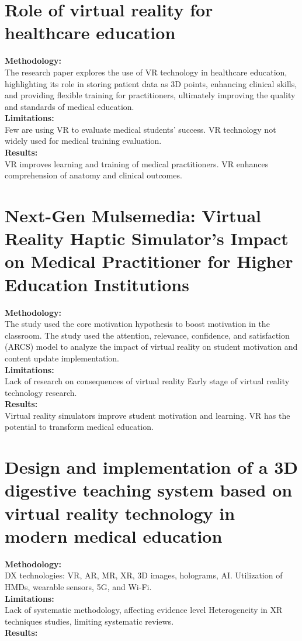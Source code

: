 \section{Role of virtual reality for healthcare education
\cite{BookChapter}}
\textbf{Methodology:}\\The research paper explores the use of VR technology in healthcare education, highlighting its role in storing patient data as 3D points, enhancing clinical skills, and providing flexible training for practitioners, ultimately improving the quality and standards of medical education.\\
\textbf{Limitations:}\\
Few are using VR to evaluate medical students' success. VR technology not widely used for medical training evaluation.\\
\textbf{Results:}\\ VR improves learning and training of medical practitioners.
VR enhances comprehension of anatomy and clinical outcomes.
\section{Next-Gen Mulsemedia: Virtual Reality Haptic Simulator’s Impact on Medical Practitioner for Higher Education Institutions\cite{journalarticle4}\cite{JournalArticle5}\cite{JournalArticle8}}
\textbf{Methodology:}\\ The study used the core motivation hypothesis to boost motivation in the classroom. The study used the attention, relevance, confidence, and satisfaction (ARCS) model to analyze the impact of virtual reality on student motivation and content update implementation.\\
\textbf{Limitations:}\\ Lack of research on consequences of virtual reality
Early stage of virtual reality technology research.\\
\textbf{Results:}\\ Virtual reality simulators improve student motivation and learning. VR has the potential to transform medical education.

\section{Design and implementation of a 3D digestive teaching system based on virtual reality technology in modern medical education\cite{Journal1}}
\textbf{Methodology:}\\
DX technologies: VR, AR, MR, XR, 3D images, holograms, AI. Utilization of HMDs, wearable sensors, 5G, and Wi-Fi.\\
\textbf{Limitations:}\\ Lack of systematic methodology, affecting evidence level
Heterogeneity in XR techniques studies, limiting systematic reviews.\\
\textbf{Results:}\\ 

